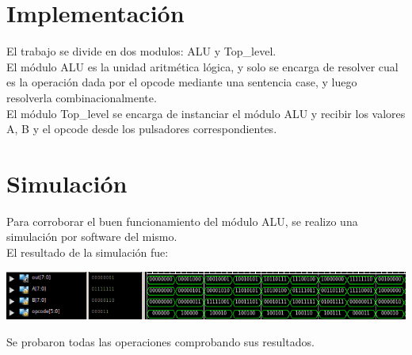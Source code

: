 \documentclass{article}
\begin{document}
\section{Implementación}
El trabajo se divide en dos modulos: ALU y Top\_level.\\
\indent El módulo ALU es la unidad aritmética lógica, y solo se encarga de
resolver cual es la operación dada por el opcode mediante una sentencia case, y
luego resolverla combinacionalmente.\\
\indent El módulo Top\_level se encarga de instanciar el módulo ALU y recibir
los valores A, B y el opcode desde los pulsadores correspondientes.

\section{Simulación}
Para corroborar el buen funcionamiento del módulo ALU, se realizo una
simulación por software del mismo.\\
\indent El resultado de la simulación fue:
\begin{center}
    \includegraphics[scale=0.55]{simulacion}
\end{center}
\indent Se probaron todas las operaciones comprobando sus resultados.
\end{document}
